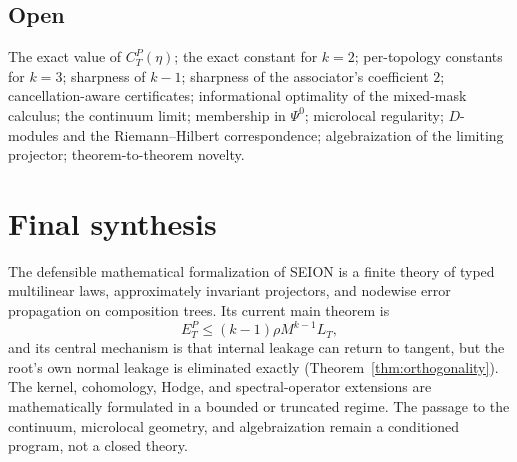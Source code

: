 \documentclass[11pt]{amsart}
\theoremstyle{definition}
\theoremstyle{remark}
\begin{document}
\subsection{Open}
The exact value of $C_T^P(\eta)$; the exact constant for $k=2$;
per-topology constants for $k=3$; sharpness of $k-1$; sharpness of the
associator's coefficient $2$; cancellation-aware certificates;
informational optimality of the mixed-mask calculus; the continuum
limit; membership in $\Psi^0$; microlocal regularity; $D$-modules and
the Riemann--Hilbert correspondence; algebraization of the limiting
projector; theorem-to-theorem novelty.

\section{Final synthesis}

The defensible mathematical formalization of SEION is a finite theory
of typed multilinear laws, approximately invariant projectors, and
nodewise error propagation on composition trees. Its current main
theorem is
\[
E_T^{P} \le (k-1)\rho M^{k-1}L_T,
\]
and its central mechanism is that internal leakage can return to
tangent, but the root's own normal leakage is eliminated exactly
(Theorem~\ref{thm:orthogonality}). The kernel, cohomology, Hodge, and
spectral-operator extensions are mathematically formulated in a bounded
or truncated regime. The passage to the continuum, microlocal geometry,
and algebraization remain a conditioned program, not a closed theory.
\end{document}
